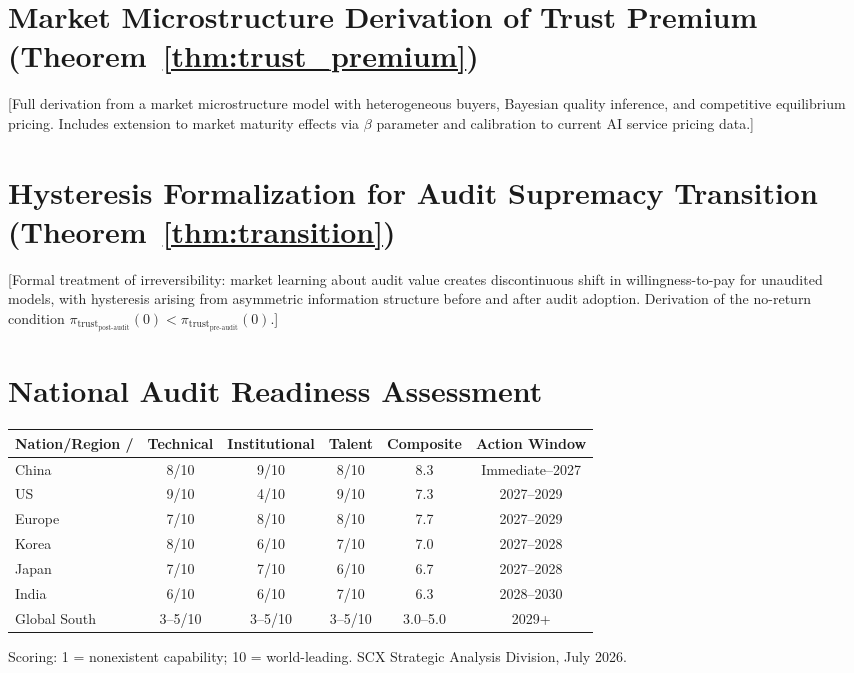 \documentclass[11pt,a4paper]{article}
\theoremstyle{definition}
\theoremstyle{remark}
\newcommand{\trustPremium}{\pi_{\text{trust}}}
\begin{document}
\section{Market Microstructure Derivation of Trust Premium (Theorem~\ref{thm:trust_premium}) }
\label{app:trust_premium_derivation}
[Full derivation from a market microstructure model with heterogeneous buyers, Bayesian quality inference, and competitive equilibrium pricing. Includes extension to market maturity effects via $\beta$ parameter and calibration to current AI service pricing data.]
\section{Hysteresis Formalization for Audit Supremacy Transition (Theorem~\ref{thm:transition}) }
\label{app:hysteresis}
[Formal treatment of irreversibility: market learning about audit value creates discontinuous shift in willingness-to-pay for unaudited models, with hysteresis arising from asymmetric information structure before and after audit adoption. Derivation of the no-return condition $\trustPremium_{\text{post-audit}}(0) < \trustPremium_{\text{pre-audit}}(0)$.]
\section{National Audit Readiness Assessment}
\label{app:readiness}
\begin{center}
\begin{tabular}{lccccc}
\toprule
\textbf{Nation/Region /} & \textbf{Technical } & \textbf{Institutional } & \textbf{Talent } & \textbf{Composite } & \textbf{Action Window } \\
\midrule
China  & 8/10 & 9/10 & 8/10 & 8.3 & Immediate--2027 \\
US  & 9/10 & 4/10 & 9/10 & 7.3 & 2027--2029 \\
Europe  & 7/10 & 8/10 & 8/10 & 7.7 & 2027--2029 \\
Korea  & 8/10 & 6/10 & 7/10 & 7.0 & 2027--2028 \\
Japan  & 7/10 & 7/10 & 6/10 & 6.7 & 2027--2028 \\
India  & 6/10 & 6/10 & 7/10 & 6.3 & 2028--2030 \\
Global South  & 3--5/10 & 3--5/10 & 3--5/10 & 3.0--5.0 & 2029+ \\
\bottomrule
\end{tabular}
\end{center}
Scoring: 1 = nonexistent capability; 10 = world-leading. SCX Strategic Analysis Division, July 2026.
\end{document}
